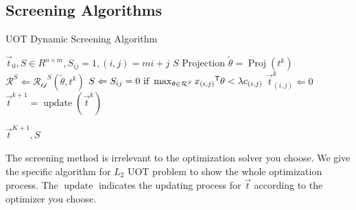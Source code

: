 \subsection{Screening Algorithms}

 \begin{algorithm}
 \caption{UOT Dynamic Screening Algorithm}
 \begin{algorithmic}[h]
 \renewcommand{\algorithmicrequire}{\textbf{Input:}}
 \renewcommand{\algorithmicensure}{\textbf{Output:}}
 \REQUIRE $\vec{t}_0, S \in R^{n\times m}, S_{ij}=1, (i,j) = mi+j$
 \ENSURE $S$
 \STATE {}
 \STATE $\text{Projection } \tilde{\theta} = \operatorname{Proj}(t^k)$ 
  \STATE $\mathcal{R}^{S} \Leftarrow \mathcal{R_{ij}}^S{(\tilde{\theta},t^k)}$
   \STATE $S \Leftarrow {S_{ij} = 0 \text{ if } \max_{\theta \in \mathcal{R}^S} {x_{(i,j)}}^{\mathsf T}\theta <\lambda c_{(i,j)} }$
 \ENDFOR
  \ENDFOR
  \STATE $\vec{t}^k_{(i,j)} \Leftarrow 0$
  \ENDFOR
  \STATE $\vec{t}^{k+1} = \operatorname{update}(\vec{t}^k)$
 \ENDFOR
  
 \RETURN $\vec{t}^{K+1}, S $ 
 \end{algorithmic} 
 \end{algorithm}

The screening method is irrelevant to the optimization solver you choose. We give the specific algorithm for $L_2$ UOT problem to show the whole optimization process. The $\operatorname{update}$ indicates the updating process for $\vec{t}$ according to the optimizer you choose.\\











































